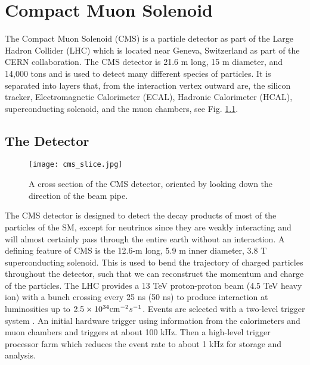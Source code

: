 \chapter{Compact Muon Solenoid}
\label{ch:CMS}

The Compact Muon Solenoid (CMS) \cite{collaboration_cms_2008} is a particle detector as part of the Large Hadron Collider (LHC) \cite{evans_lhc_2008} which is located near Geneva, Switzerland as part of the CERN collaboration. The CMS detector is 21.6 m long, 15 m diameter, and 14,000 tons and is used to detect many different species of particles. It is separated into layers that, from the interaction vertex outward are, the silicon tracker, Electromagnetic Calorimeter (ECAL), Hadronic Calorimeter (HCAL), superconducting solenoid, and the muon chambers, see Fig. \ref{CMSSlice}. 

\section{The Detector}
\label{sec:cmsIntro}

\begin{figure}
 	\centering
	\texttt{[image: cms\_slice.jpg]}
 	\caption[CMS Cross Section]{A cross section of the CMS detector, oriented by looking down the direction of the beam pipe. }
 	\label{CMSSlice} 
\end{figure}

The CMS detector is designed to detect the decay products of most of the particles of the SM, except for neutrinos since they are weakly interacting and will almost certainly pass through the entire earth without an interaction. A defining feature of CMS is the 12.6-m long, 5.9 m inner diameter, 3.8 T superconducting solenoid. This is used to bend the trajectory of charged particles throughout the detector, such that we can reconstruct the momentum and charge of the particles. The LHC provides a 13 TeV proton-proton beam (4.5 TeV heavy ion) with a bunch crossing every 25 ns (50 ns) to produce interaction at luminosities up to $2.5\times10^{34} \text{cm}^{-2}s^{-1}$. Events are selected with a two-level trigger system \cite{cms_collaboration_cms_2017}. An initial hardware trigger using information from the calorimeters and muon chambers and triggers at about 100 kHz. Then a high-level trigger processor farm which reduces the event rate to about 1 kHz for storage and analysis.

